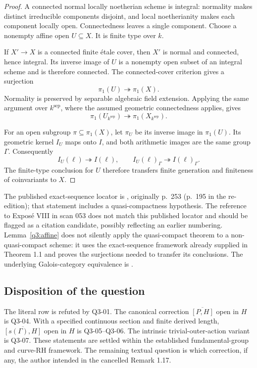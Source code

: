 \begin{proof}
A connected normal locally noetherian scheme is integral:
normality makes distinct irreducible components disjoint, and
local noetherianity makes each component locally open.
Connectedness leaves a single component.  Choose a nonempty
affine open \(U\subseteq X\).  It is finite type over \(k\).

If \(X'\to X\) is a connected finite étale cover, then \(X'\)
is normal and connected, hence integral.  Its inverse image of
\(U\) is a nonempty open subset of an integral scheme and is
therefore connected.  The connected-cover criterion
\cite[V, Proposition 6.9]{SGA1} gives a surjection
\[
\pi_1(U)\twoheadrightarrow\pi_1(X).
\]
Normality is preserved by separable algebraic field extension.
Applying the same argument over \(k^{\mathrm{sep}}\), where the
assumed geometric connectedness applies, gives
\[
\pi_1(U_{k^{\mathrm{sep}}})
\twoheadrightarrow\pi_1(X_{k^{\mathrm{sep}}}).
\]

For an open subgroup \(\pi\subseteq\pi_1(X)\), let \(\pi_U\)
be its inverse image in \(\pi_1(U)\).  Its geometric kernel
\(I_U\) maps onto \(I\), and both arithmetic images are the same
group \(\Gamma\).  Consequently
\[
I_U(\ell)\twoheadrightarrow I(\ell),\qquad
I_U(\ell)_\Gamma\twoheadrightarrow I(\ell)_\Gamma.
\]
The finite-type conclusion for \(U\) therefore transfers finite
generation and finiteness of coinvariants to \(X\).
\end{proof}

The published exact-sequence locator is
\cite[IX, Theorem 6.1]{SGA1}, originally p.~253
(p.~195 in the re-edition); that statement includes a
quasi-compactness hypothesis.  The reference to Exposé VIII in
scan 053 does not match this published locator and should be
flagged as a citation candidate, possibly reflecting an earlier
numbering.  Lemma~\ref{q3:affine} does not silently apply the
quasi-compact theorem to a non-quasi-compact scheme: it uses the
exact-sequence framework already supplied in Theorem 1.1 and
proves the surjections needed to transfer its conclusions.
The underlying Galois-category equivalence is
\cite[V, Theorem 4.1]{SGA1}.

\subsection{Disposition of the question}

The literal row is refuted by Q3-01.  The canonical correction
\(\overline{[P,H]}\) open in \(H\) is Q3-04.  With a specified
continuous section and finite derived length,
\(\overline{[s(\Gamma),H]}\) open in \(H\) is Q3-05--Q3-06.
The intrinsic trivial-outer-action variant is Q3-07.
These statements are settled within the established
fundamental-group and curve-RH framework.  The remaining textual
question is which correction, if any, the author intended in the
cancelled Remark 1.17.

